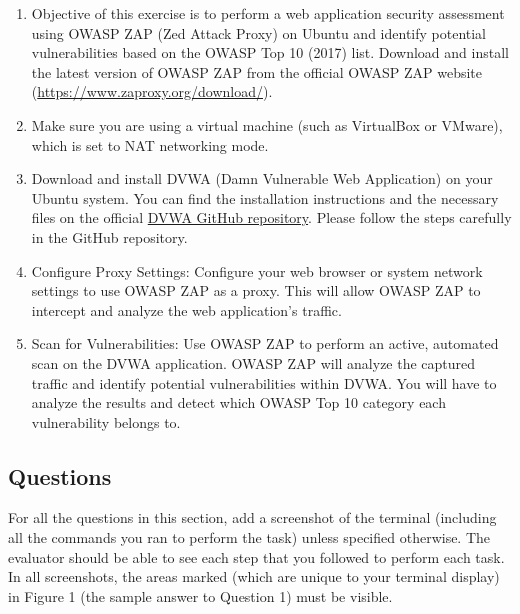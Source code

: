 \documentclass[11pt,letterpaper]{article}
\begin{document}
	\begin{enumerate}
		\item Objective of this exercise is to perform a web application security assessment using OWASP ZAP (Zed Attack Proxy) on Ubuntu and identify potential vulnerabilities based on the OWASP Top 10 (2017) list. Download and install the latest version of OWASP ZAP from the official OWASP ZAP website (\href{https://www.zaproxy.org/download/}{https://www.zaproxy.org/download/}).
		
		\item Make sure you are using a virtual machine (such as VirtualBox or VMware), which is set to NAT networking mode.
		
		\item Download and install DVWA (Damn Vulnerable Web Application) on your Ubuntu system. You can find the installation instructions and the necessary files on the official \href{https://github.com/digininja/DVWA}{DVWA GitHub repository}. Please follow the steps carefully in the GitHub repository.
		
		\item Configure Proxy Settings: Configure your web browser or system network settings to use OWASP ZAP as a proxy. This will allow OWASP ZAP to intercept and analyze the web application's traffic.
		
		\item Scan for Vulnerabilities: Use OWASP ZAP to perform an active, automated scan on the DVWA application. OWASP ZAP will analyze the captured traffic and identify potential vulnerabilities within DVWA. You will have to analyze the results and detect which OWASP Top 10 category each vulnerability belongs to.
		
	\end{enumerate}
	
	\newpage
	\subsection*{Questions}
	
	For all the questions in this section, add a screenshot of the terminal (including all the commands you ran to perform the task) unless specified otherwise. The evaluator should be able to see each step that you followed to perform each task. In all screenshots, the areas marked (which are unique to your terminal display) in Figure 1 (the sample answer to Question 1) must be visible.
	
\end{document}

